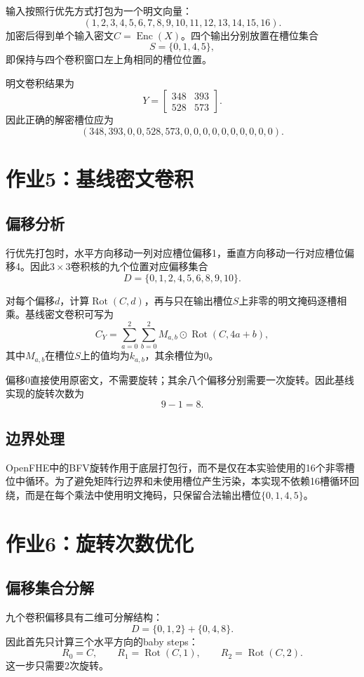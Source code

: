 \documentclass[UTF8,a4paper,12pt]{ctexart}
\begin{document}
输入按照行优先方式打包为一个明文向量：
\[
(1,2,3,4,5,6,7,8,9,10,11,12,13,14,15,16).
\]
加密后得到单个输入密文$C=\operatorname{Enc}(X)$。四个输出分别放置在槽位集合
\[
S=\{0,1,4,5\},
\]
即保持与四个卷积窗口左上角相同的槽位位置。

明文卷积结果为
\[
Y=\begin{bmatrix}
348&393\\
528&573
\end{bmatrix}.
\]
因此正确的解密槽位应为
\[
(348,393,0,0,528,573,0,0,0,0,0,0,0,0,0,0).
\]

\section{作业5：基线密文卷积}
\subsection{偏移分析}
行优先打包时，水平方向移动一列对应槽位偏移1，垂直方向移动一行对应槽位偏移4。因此$3\times3$卷积核的九个位置对应偏移集合
\[
D=\{0,1,2,4,5,6,8,9,10\}.
\]

对每个偏移$d$，计算$\operatorname{Rot}(C,d)$，再与只在输出槽位$S$上非零的明文掩码逐槽相乘。基线密文卷积可写为
\[
C_Y=\sum_{a=0}^{2}\sum_{b=0}^{2}
M_{a,b}\odot\operatorname{Rot}(C,4a+b),
\]
其中$M_{a,b}$在槽位$S$上的值均为$k_{a,b}$，其余槽位为0。

偏移0直接使用原密文，不需要旋转；其余八个偏移分别需要一次旋转。因此基线实现的旋转次数为
\[
9-1=8.
\]

\subsection{边界处理}
OpenFHE中的BFV旋转作用于底层打包行，而不是仅在本实验使用的16个非零槽位中循环。为了避免矩阵行边界和未使用槽位产生污染，本实现不依赖16槽循环回绕，而是在每个乘法中使用明文掩码，只保留合法输出槽位$\{0,1,4,5\}$。

\section{作业6：旋转次数优化}
\subsection{偏移集合分解}
九个卷积偏移具有二维可分解结构：
\[
D=\{0,1,2\}+\{0,4,8\}.
\]
因此首先只计算三个水平方向的baby steps：
\[
R_0=C,\qquad
R_1=\operatorname{Rot}(C,1),\qquad
R_2=\operatorname{Rot}(C,2).
\]
这一步只需要2次旋转。
\end{document}
